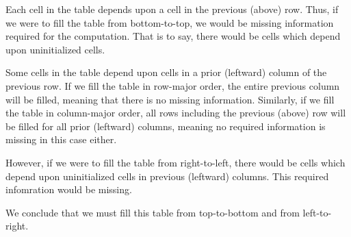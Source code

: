 \begin{enumerate}
\begin{solution}
Each cell in the table depends upon a cell in the previous (above) row. Thus, if we were to fill the table from bottom-to-top, we would be missing information required for the computation. That is to say, there would be cells which depend upon uninitialized cells.

Some cells in the table depend upon cells in a prior (leftward) column of the previous row. If we fill the table in row-major order, the entire previous column will be filled, meaning that there is no missing information. Similarly, if we fill the table in column-major order, all rows including the previous (above) row will be filled for all prior (leftward) columns, meaning no required information is missing in this case either.

However, if we were to fill the table from right-to-left, there would be cells which depend upon uninitialized cells in previous (leftward) columns. This required infomration would be missing.

We conclude that we must fill this table from top-to-bottom and from left-to-right.
\end{solution}
\end{enumerate}
